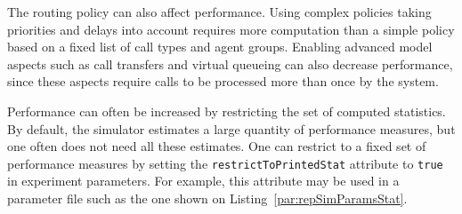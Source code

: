 
The routing policy can also affect performance.
Using complex policies taking priorities and delays into account
requires more computation than a simple policy based on a fixed list
of call types and agent groups.
Enabling advanced model aspects such as call transfers and virtual
queueing can also decrease performance, since these aspects require
calls to be processed more than once by the system.

Performance can often be increased by restricting the set of computed
statistics.
By default, the simulator estimates a large quantity of performance
measures, but one often does not need all these estimates.
One can restrict to a fixed set of performance measures by setting
the \texttt{restrict\-To\-Printed\-Stat} attribute
to \texttt{true}
in experiment parameters.
For example, this attribute may be used in a parameter file such as
the one shown on Listing~\ref{par:repSimParamsStat}.
